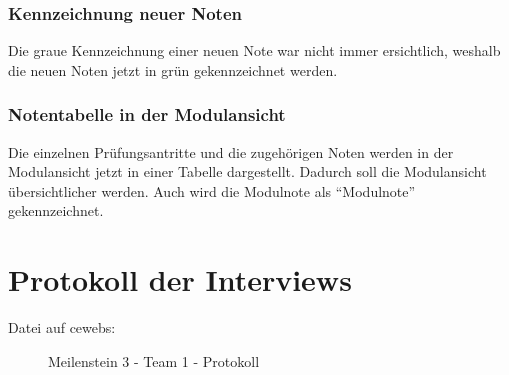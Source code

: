 \documentclass[a4paper,10pt]{scrartcl}
\begin{document}
\subsubsection*{Kennzeichnung neuer Noten}

Die graue Kennzeichnung einer neuen Note war nicht immer ersichtlich, weshalb die neuen Noten jetzt in grün gekennzeichnet werden.

\noindent{}
\medskip

\subsubsection*{Notentabelle in der Modulansicht}

Die einzelnen Prüfungsantritte und die zugehörigen Noten werden in der Modulansicht jetzt in einer Tabelle dargestellt. Dadurch soll die Modulansicht übersichtlicher werden. Auch wird
die Modulnote als ``Modulnote'' gekennzeichnet.

\noindent{}
\medskip



\section{Protokoll der Interviews}

\begin{description}
 \item[Datei auf cewebs:]Meilenstein 3 - Team 1 - Protokoll
\end{description}
\end{document}
